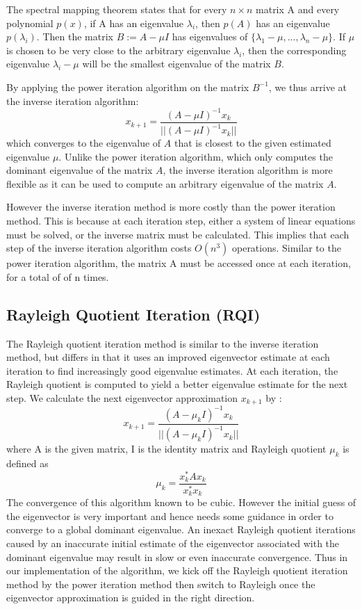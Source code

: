 \documentclass[11pt]{amsart}
\begin{document}
The spectral mapping theorem states that for every $n\times n$ matrix A and every polynomial $p(x)$, if A has an eigenvalue $\lambda_i$, then $p(A)$ has an eigenvalue $p(\lambda_i)$. Then the matrix $B := A - \mu I$ has eigenvalues of $\{\lambda_1 - \mu,...,\lambda_n - \mu\}$. If $\mu$ is chosen to be very close to the arbitrary eigenvalue $\lambda_i$, then the corresponding eigenvalue $\lambda_i - \mu$ will be the smallest eigenvalue of the matrix $B$.

By applying the power iteration algorithm on the matrix $B^{-1}$, we thus arrive at the inverse iteration algorithm: 
\[
	x_{k+1} = \frac{(A-\mu I)^{-1}x_k}{||(A-\mu I)^{-1}x_k||}
\]
which converges to the eigenvalue of $A$ that is closest to the given estimated eigenvalue $\mu$. Unlike the power iteration algorithm, which only computes the dominant eigenvalue of the matrix $A$, the inverse iteration algorithm is more flexible as it can be used to compute an arbitrary eigenvalue of the matrix $A$.

However the inverse iteration method is more costly than the power iteration method. This is because at each iteration step, either a system of linear equations must be solved, or the inverse matrix must be calculated. This implies that each step of the inverse iteration algorithm costs $O(n^3)$ operations. Similar to the power iteration algorithm, the matrix A must be accessed once at each iteration, for a total of of n times. 



\subsection{Rayleigh Quotient Iteration (RQI)}
The Rayleigh quotient iteration method is similar to the inverse iteration method, but differs in that it uses an improved eigenvector estimate at each iteration to find increasingly good eigenvalue estimates. At each iteration, the Rayleigh quotient is computed to  yield a better eigenvalue estimate for the next step. We calculate the next eigenvector approximation $x_{k+1}$ by :
\[
x_{k+1} = \frac{(A-\mu_{k}I)^{-1}x_k}{||(A-\mu_{k}I)^{-1}x_{k}||}
\]
where A is the given matrix, I is the identity matrix and Rayleigh quotient $\mu_k$ is defined as
\[
\mu_k = \frac{x^\ast_kAx_k}{x^\ast_kx_k}
\]
The convergence of this algorithm known to be cubic. However the initial guess of the eigenvector is very important and hence needs some guidance in order to converge to a global dominant eigenvalue. An inexact Rayleigh quotient iterations caused by an inaccurate initial estimate of the eigenvector associated with the dominant eigenvalue may result in slow or even inaccurate convergence. Thus in our implementation of the algorithm, we kick off the Rayleigh quotient iteration method by the power iteration method then switch to Rayleigh once the eigenvector approximation is guided in the right direction. 
\end{document}
